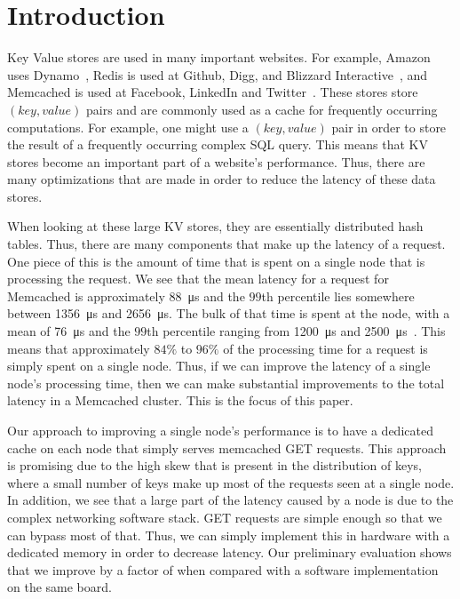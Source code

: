 \section{Introduction}
Key Value stores are used in many important websites. For example, Amazon uses
Dynamo~\cite{dynamo}, Redis is used at Github, Digg, and Blizzard
Interactive~\cite{Reddi10}, and Memcached is used at Facebook, LinkedIn and
Twitter~\cite{memcached, Petrovic08}. These stores store $(key, value)$ pairs and are
commonly used as a cache for frequently occurring computations. For example,
one might use a $(key, value)$ pair in order to store the result of a
frequently occurring complex SQL query. This means that KV stores become an
important part of a website's performance. Thus, there are many optimizations
that are made in order to reduce the latency of these data stores.

When looking at these large KV stores, they are essentially distributed hash
tables. Thus, there are many components that make up the latency of a request.
One piece of this is the amount of time that is spent on a single node that is
processing the request. We see that the mean latency for a request for
Memcached is approximately \SI{88}{\micro\s} and the $99$th percentile lies
somewhere between \SI{1356}{\micro\s} and \SI{2656}{\micro\s}.  The bulk
of that time is spent at the node, with a mean of \SI{76}{\micro\s} and
the $99$th percentile ranging from \SI{1200}{\micro\s} and
\SI{2500}{\micro\s}~\cite{Kapoor2012}.  This means that approximately
$84\%$ to $96\%$ of the processing time for a request is simply spent on a
single node. Thus, if we can improve the latency of a single node's processing
time, then we can make substantial improvements to the total latency in a
Memcached cluster. This is the focus of this paper.

Our approach to improving a single node's performance is to have a dedicated
cache on each node that simply serves memcached GET requests. This approach is
promising due to the high skew that is present in the distribution of keys,
where a small number of keys make up most of the requests seen at a single
node. In addition, we see that a large part of the latency caused by a node is
due to the complex networking software stack. GET requests are simple enough so
that we can bypass most of that. Thus, we can simply implement this in hardware
with a dedicated memory in order to decrease latency. Our preliminary
evaluation shows that we improve by a factor of 
when compared with a software implementation on the same board.

